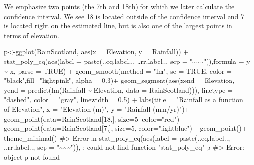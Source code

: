 \documentclass[
  letterpaper,
  DIV=11,
  numbers=noendperiod]{scrreprt}
\newenvironment{Shaded}{\begin{snugshade}}{\end{snugshade}}
\newcommand{\AttributeTok}[1]{\textcolor[rgb]{0.40,0.45,0.13}{#1}}
\newcommand{\CommentTok}[1]{\textcolor[rgb]{0.37,0.37,0.37}{#1}}
\newcommand{\ConstantTok}[1]{\textcolor[rgb]{0.56,0.35,0.01}{#1}}
\newcommand{\DecValTok}[1]{\textcolor[rgb]{0.68,0.00,0.00}{#1}}
\newcommand{\FloatTok}[1]{\textcolor[rgb]{0.68,0.00,0.00}{#1}}
\newcommand{\FunctionTok}[1]{\textcolor[rgb]{0.28,0.35,0.67}{#1}}
\newcommand{\NormalTok}[1]{\textcolor[rgb]{0.00,0.23,0.31}{#1}}
\newcommand{\OtherTok}[1]{\textcolor[rgb]{0.00,0.23,0.31}{#1}}
\newcommand{\SpecialCharTok}[1]{\textcolor[rgb]{0.37,0.37,0.37}{#1}}
\newcommand{\StringTok}[1]{\textcolor[rgb]{0.13,0.47,0.30}{#1}}
\begin{document}
We emphasize two points (the 7th and 18th) for which we later calculate
the confidence interval. We see 18 is located outside of the confidence
interval and 7 is located right on the estimated line, but is also one
of the largest points in terms of elevation.

\begin{Shaded}
\begin{Highlighting}[]
\NormalTok{p}\OtherTok{\textless{}{-}}\FunctionTok{ggplot}\NormalTok{(RainScotland, }\FunctionTok{aes}\NormalTok{(}\AttributeTok{x =}\NormalTok{ Elevation, }\AttributeTok{y =}\NormalTok{ Rainfall))  }\SpecialCharTok{+}
  \FunctionTok{stat\_poly\_eq}\NormalTok{(}\FunctionTok{aes}\NormalTok{(}\AttributeTok{label =} \FunctionTok{paste}\NormalTok{(..eq.label.., ..rr.label.., }\AttributeTok{sep =} \StringTok{"\textasciitilde{}\textasciitilde{}\textasciitilde{}"}\NormalTok{)),}\AttributeTok{formula =}\NormalTok{ y }\SpecialCharTok{\textasciitilde{}}\NormalTok{ x, }\AttributeTok{parse =} \ConstantTok{TRUE}\NormalTok{) }\SpecialCharTok{+}
  \FunctionTok{geom\_smooth}\NormalTok{(}\AttributeTok{method =} \StringTok{"lm"}\NormalTok{, }\AttributeTok{se =} \ConstantTok{TRUE}\NormalTok{, }\AttributeTok{color =} \StringTok{"black"}\NormalTok{,}\AttributeTok{fill=}\StringTok{"lightpink"}\NormalTok{, }\AttributeTok{alpha =} \FloatTok{0.3}\NormalTok{)}\SpecialCharTok{+}
  \FunctionTok{geom\_segment}\NormalTok{(}\FunctionTok{aes}\NormalTok{(}\AttributeTok{xend =}\NormalTok{ Elevation, }\AttributeTok{yend =} \FunctionTok{predict}\NormalTok{(}\FunctionTok{lm}\NormalTok{(Rainfall }\SpecialCharTok{\textasciitilde{}}\NormalTok{ Elevation, }\AttributeTok{data =}\NormalTok{ RainScotland))), }\AttributeTok{linetype =} \StringTok{"dashed"}\NormalTok{, }\AttributeTok{color =} \StringTok{"gray"}\NormalTok{, }\AttributeTok{linewidth  =} \FloatTok{0.5}\NormalTok{) }\SpecialCharTok{+}
  \FunctionTok{labs}\NormalTok{(}\AttributeTok{title =} \StringTok{"Rainfall as a function of Elevation"}\NormalTok{, }\AttributeTok{x =} \StringTok{"Elevation (m)"}\NormalTok{, }\AttributeTok{y =} \StringTok{"Rainfall (mm/yr)"}\NormalTok{)}\SpecialCharTok{+}
  \FunctionTok{geom\_point}\NormalTok{(}\AttributeTok{data=}\NormalTok{RainScotland[}\DecValTok{18}\NormalTok{,], }\AttributeTok{size=}\DecValTok{5}\NormalTok{, }\AttributeTok{color=}\StringTok{"red"}\NormalTok{)}\SpecialCharTok{+}
  \FunctionTok{geom\_point}\NormalTok{(}\AttributeTok{data=}\NormalTok{RainScotland[}\DecValTok{7}\NormalTok{,], }\AttributeTok{size=}\DecValTok{5}\NormalTok{, }\AttributeTok{color=}\StringTok{"lightblue"}\NormalTok{)}\SpecialCharTok{+}
  \FunctionTok{geom\_point}\NormalTok{()}\SpecialCharTok{+}
  \FunctionTok{theme\_minimal}\NormalTok{()}
\CommentTok{\#\textgreater{} Error in stat\_poly\_eq(aes(label = paste(..eq.label.., ..rr.label.., sep = "\textasciitilde{}\textasciitilde{}\textasciitilde{}")), : could not find function "stat\_poly\_eq"}
\NormalTok{p}
\CommentTok{\#\textgreater{} Error: object \textquotesingle{}p\textquotesingle{} not found}
\end{Highlighting}
\end{Shaded}
\end{document}
